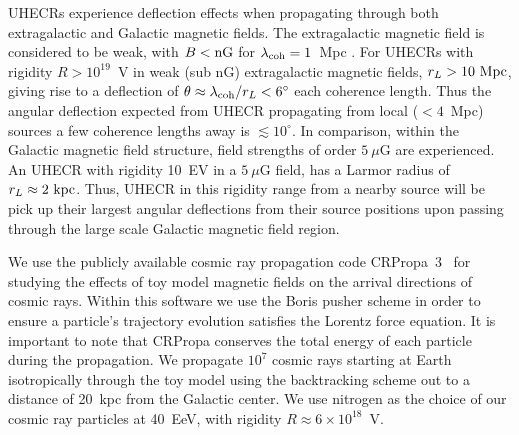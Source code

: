\documentclass[usenatbib]{mnras}
\begin{document}
UHECRs experience deflection effects when propagating through both extragalactic and Galactic magnetic fields. The extragalactic magnetic field is considered to be weak, with $B < \rm {nG}$ for $\lambda_{\rm coh}=1$~Mpc \citep{Blasi_1999, Kronberg_2007}. For UHECRs with rigidity $R > 10^{19}$~V in weak (sub nG) extragalactic magnetic fields, $r_{L}>{\rm 10~Mpc}$, giving rise to a deflection of $\theta\approx \lambda_{\rm coh}/r_{L}<6^{\circ}$ each coherence length. Thus the angular deflection expected from UHECR propagating from local ($<4$~Mpc) sources a few coherence lengths away is $\lesssim 10^{\circ}$. In comparison, within the Galactic magnetic field structure, field strengths of order $5~\mu$G are experienced. An UHECR with rigidity 10~EV in a $5~\mu$G field, has a Larmor radius of $r_L \approx 2 ~ \rm kpc$. Thus, UHECR in this rigidity range from a nearby source will be pick up their largest angular deflections from their source positions upon passing through the large scale Galactic magnetic field region.

We use the publicly available cosmic ray propagation code CRPropa~3~\citep{CRPropa3_2016} for studying the effects of toy model magnetic fields on the arrival directions of cosmic rays. Within this software we use the Boris pusher scheme in order to ensure a particle's trajectory evolution satisfies the Lorentz force equation. It is important to note that CRPropa conserves the total energy of each particle during the propagation.
We propagate $10^7$ cosmic rays starting at Earth isotropically through the toy model using the backtracking scheme out to a distance of 20~kpc from the Galactic center. We use nitrogen as the choice of our cosmic ray particles at 40~EeV, with rigidity $R\approx 6 \times 10^{18}$~V. 
\end{document}
